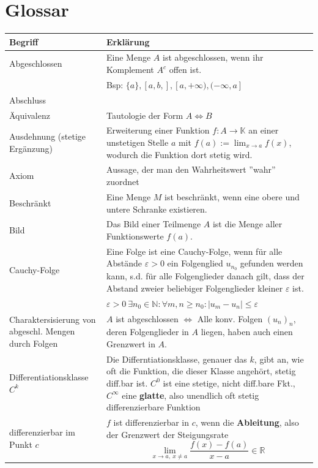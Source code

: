 \documentclass{article}
\begin{document}
\section{Glossar}
\begin{xltabular}{\linewidth}{p{6cm}|X}
	\hline\hline
		Begriff & Erklärung \\
	\hline
		Abgeschlossen & Eine Menge $A$ ist abgeschlossen, wenn ihr Komplement $A^c$ offen ist.\\
	& Bsp: $\{a\}, [a,b,], [a,+\infty), (-\infty, a]$ \\
	\hline
		Abschluss &  \\
	\hline
		Äquivalenz & Tautologie der Form $A \Leftrightarrow B$ \\
	\hline
		Ausdehnung (stetige Ergänzung) & Erweiterung einer Funktion $f:A\rightarrow\mathbb{K}$ an einer unstetigen Stelle $a$ mit $f(a) := \lim_{x\rightarrow a}f(x)$, wodurch die Funktion dort stetig wird. \\
	\hline
		Axiom & Aussage, der man den Wahrheitswert ''wahr'' zuordnet \\
	\hline
		Beschränkt & Eine Menge $M$ ist beschränkt, wenn eine obere und untere Schranke existieren. \\
	\hline
		Bild & Das Bild einer Teilmenge $A$ ist die Menge aller Funktionswerte $f(a)$. \\
	\hline
		Cauchy-Folge & Eine Folge ist eine Cauchy-Folge, wenn für alle Abstände $\varepsilon > 0$ ein Folgenglied $u_{n_0}$ gefunden werden kann, s.d. für alle Folgenglieder danach gilt, dass der Abstand zweier beliebiger Folgenglieder kleiner $\varepsilon$ ist.\\
		& $\varepsilon > 0\ \exists n_0\in \mathbb{N}: \forall m,n\geq n_0: |u_m - u_n| \leq \varepsilon$ \\
	\hline
		Charaktersisierung von abgeschl. Mengen durch Folgen & $A$ ist abgeschlossen $\Leftrightarrow$ Alle konv. Folgen $(u_n)_n$, deren Folgenglieder in $A$ liegen, haben auch einen Grenzwert in $A$. \\
	\hline
		Differentiationsklasse $C^k$ & Die Differntiationsklasse, genauer das $k$, gibt an, wie oft die Funktion, die dieser Klasse angehört, stetig diff.bar ist. $C^0$ ist eine stetige, nicht diff.bare Fkt., $C^\infty$ eine \textbf{glatte}, also unendlich oft stetig differenzierbare Funktion \\
	\hline
		differenzierbar im Punkt $c$ & $f$ ist differenzierbar in $c$, wenn die \textbf{Ableitung}, also der Grenzwert der Steigungsrate
			$$\lim\limits_{x\rightarrow a,\ x\neq a} \frac{f(x) - f(a)}{x - a} \in\mathbb{R}$$

\end{xltabular}
\end{document}
